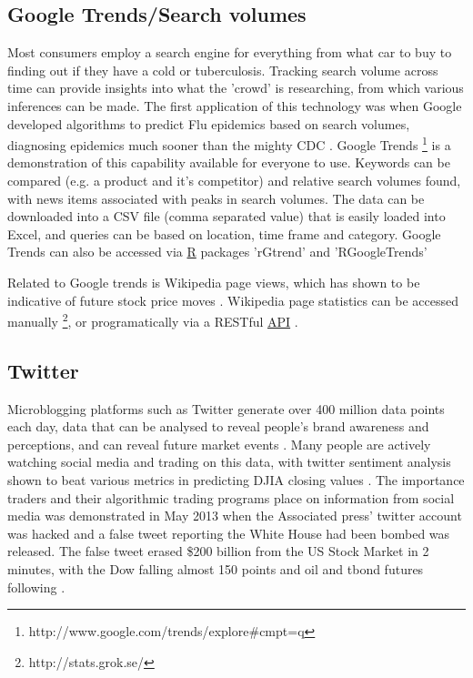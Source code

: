 \documentclass[11pt]{article}
\begin{document}
	\subsection{Google Trends/Search volumes}
	Most consumers employ a search engine for everything from what car to buy to finding out if they have a cold or tuberculosis.
	Tracking search volume across time can provide insights into what the 'crowd' is researching, from which various inferences can be made.
	The first application of this technology was when Google developed algorithms to predict Flu epidemics based on search volumes, diagnosing epidemics much sooner than the mighty CDC \cite{Ginsberg2009}.
	Google Trends \footnote{http://www.google.com/trends/explore\#cmpt=q} is a demonstration of this capability available for everyone to use. 
	Keywords can be compared (e.g. a product and it's competitor) and relative search volumes found, with news items associated with peaks in search volumes. 
	The data can be downloaded into a CSV file (comma separated value) that is easily loaded into Excel, and queries can be based on location, time frame and category.
	Google Trends can also be accessed via \hyperref[R]{R} packages 'rGtrend' and 'RGoogleTrends'
		

	Related to Google trends is Wikipedia page views, which has shown to be indicative of future stock price moves \cite{Moat2013}.
	Wikipedia page statistics can be accessed manually \footnote{http://stats.grok.se/}, or programatically via a RESTful \hyperref[api]{API} \cite{Peetz}. 

	\subsection{Twitter}
	Microblogging platforms such as Twitter generate over 400 million data points each day, data that can be analysed to reveal people's brand awareness and perceptions, and can reveal future market events \cite{Ruiz2012}.
	Many people are actively watching social media and trading on this data, with twitter sentiment analysis shown to beat various metrics in predicting DJIA closing values \cite{Bollen2011}.
	The importance traders and their algorithmic trading programs place on information from social media was demonstrated in May 2013 when the Associated press' twitter account was hacked and a false tweet reporting the White House had been bombed was released. 
	The false tweet erased \$200 billion from the US Stock Market in 2 minutes, with the Dow falling almost 150 points and oil and tbond futures following \cite{wsj13}. 
\end{document}
